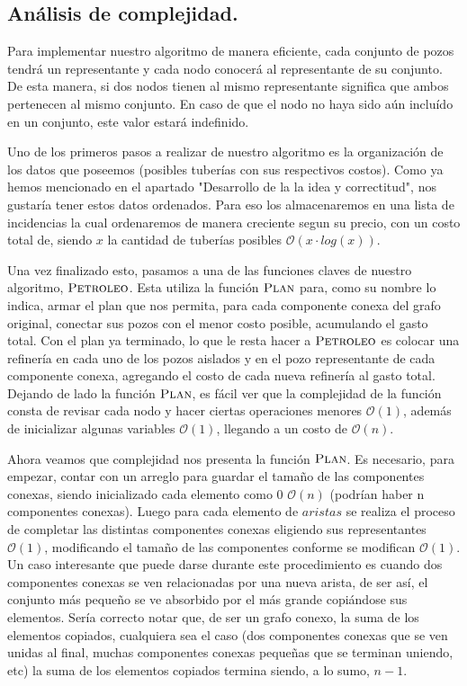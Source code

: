\vspace*{0.6cm}

\subsection{Análisis de complejidad.}

\vspace*{0.3cm}

Para implementar nuestro algoritmo de manera eficiente, cada conjunto de pozos tendrá un representante y cada nodo conocerá al representante de su conjunto. De esta manera, si dos nodos tienen al mismo representante significa que ambos pertenecen al mismo conjunto.  En caso de que el nodo no haya sido aún incluído en un conjunto, este valor estará indefinido.


Uno de los primeros pasos a realizar de nuestro algoritmo es la organización de los datos que poseemos (posibles tuberías con sus respectivos costos). Como ya hemos mencionado en el apartado "Desarrollo de la la idea y correctitud", nos gustaría tener estos datos ordenados. Para eso los almacenaremos en una lista de incidencias la cual ordenaremos de manera creciente segun su precio, con un costo total de, siendo $x$ la cantidad de tuberías posibles $\mathcal{O}(x \cdot log(x))$.

Una vez finalizado esto, pasamos a una de las funciones claves de nuestro algoritmo, $\textnormal{\scshape Petroleo}$. Esta utiliza la función $\textnormal{\scshape Plan}$ para, como su nombre lo indica, armar el plan que nos permita, para cada componente conexa del grafo original, conectar sus pozos con el menor costo posible, acumulando el gasto total. Con el plan ya terminado, lo que le resta hacer a $\textnormal{\scshape Petroleo}$ es colocar una refinería en cada uno de los pozos aislados y en el pozo representante de cada componente conexa, agregando el costo de cada nueva refinería al gasto total. Dejando de lado la función $\textnormal{\scshape Plan}$, es fácil ver que la complejidad de la función consta de revisar cada nodo y hacer ciertas operaciones menores $\mathcal{O}(1)$, además de inicializar algunas variables $\mathcal{O}(1)$, llegando a un costo de $\mathcal{O}(n)$.

Ahora veamos que complejidad nos presenta la función $\textnormal{\scshape Plan}$. Es necesario, para empezar, contar con un arreglo para guardar el tamaño de las componentes conexas, siendo inicializado cada elemento como 0 $\mathcal{O}(n)$ (podrían haber n componentes conexas). Luego para cada elemento de $aristas$ se realiza el proceso de completar las distintas componentes conexas eligiendo sus representantes $\mathcal{O}(1)$, modificando el tamaño de las componentes conforme se modifican $\mathcal{O}(1)$. Un caso interesante que puede darse durante este procedimiento es cuando dos componentes conexas se ven relacionadas por una nueva arista, de ser así, el conjunto más pequeño se ve absorbido por el más grande copiándose sus elementos. Sería correcto notar que, de ser un grafo conexo, la suma de los elementos copiados, cualquiera sea el caso (dos componentes conexas que se ven unidas al final, muchas componentes conexas pequeñas que se terminan uniendo, etc) la suma de los elementos copiados termina siendo, a lo sumo, $n-1$.

